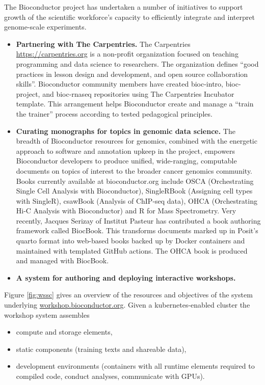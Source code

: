 The Bioconductor project has undertaken a number
of initiatives to support growth of the
scientific workforce's capacity to efficiently
integrate and interpret
genome-scale experiments.

\begin{itemize}
\item
  \textbf{Partnering with The Carpentries.} The Carpentries \url{https://carpentries.org} is a non-profit organization focused on teaching programming
  and data science to researchers. The organization defines ``good
  practices in lesson design and development, and open source
  collaboration skills''. Bioconductor community members have
  created bioc-intro, bioc-project, and bioc-rnaseq repositories
  using The Carpentries Incubator template. This arrangement helps
  Bioconductor create and manage a ``train the trainer'' process
  according to tested pedagogical principles.
\item
  \textbf{Curating monographs for topics in genomic data science.} The
  breadth of Bioconductor resources for genomics, combined with the
  energetic approach to software and annotation upkeep in the project,
  empowers Bioconductor developers to produce unified, wide-ranging,
  computable documents on topics of interest to the broader
  cancer genomics community. Books currently available
  at bioconductor.org include OSCA (Orchestrating Single Cell Analysis
  with Bioconductor), SingleRBook (Assigning cell types with SingleR),
  csawBook (Analysis of ChIP-seq data), OHCA (Orchestrating Hi-C
  Analysis with Bioconductor) and R for Mass Spectrometry. Very
  recently, Jacques Serizay of Institut Pasteur has contributed
  a book authoring framework called BiocBook. This transforms documents
  marked up in Posit's quarto format into web-based books backed up by Docker
  containers and maintained with templated GitHub actions. The
  OHCA book is produced and managed with BiocBook.
\item
  \textbf{A system for authoring and deploying interactive workshops.}
\end{itemize}

Figure \ref{fig:wssc} gives an overview of the resources and
objectives of the system underlying \url{workshop.bioconductor.org}.
Given a kubernetes-enabled cluster
the workshop system assembles

\begin{itemize}
\tightlist
\item
  compute and storage elements,
\item
  static components (training texts and shareable data),
\item
  development environments (containers with all runtime elements
  required to compiled code, conduct analyses, communicate with GPUs).
\end{itemize}

